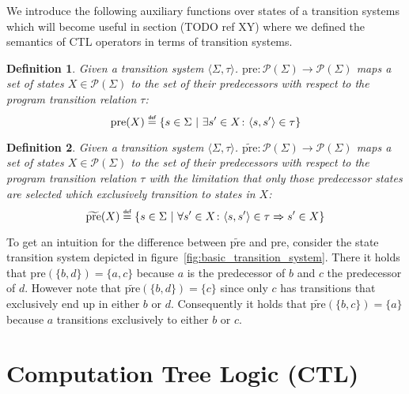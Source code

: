 \documentclass[11pt,a4paper,titlepage]{article}
\newtheorem{definition}{Definition}[section]
\newcommand\eqdef{\mathrel{\overset{\makebox[0pt]{\mbox{\normalfont\tiny\sffamily def}}}{=}}}
\begin{document}
We introduce the following auxiliary functions over states of a transition systems which will become 
useful in section (TODO ref XY) where we defined the semantics of CTL operators in terms of transition systems.

\begin{definition}\label{def:pre}
    Given a transition system $\langle \Sigma, \tau \rangle$. $\text{pre} \colon \mathcal{P}(\Sigma) \to \mathcal{P}(\Sigma)$
    maps a set of states $X \in \mathcal{P}(\Sigma)$ to the set of their predecessors with respect to the program transition
    relation $\tau$:
\begin{equation}
    \text{pre}(X) \eqdef \{s \in \Sigma \ | \ \exists s' \in X \colon \langle s, s' \rangle \in \tau \}  
\end{equation}
\end{definition}


\begin{definition}\label{def:tilde_pre}
    Given a transition system $\langle \Sigma, \tau \rangle$. $\widetilde{\text{pre}} \colon \mathcal{P}(\Sigma) \to \mathcal{P}(\Sigma)$
    maps a set of states $X \in \mathcal{P}(\Sigma)$ to the set of their predecessors with respect to the program transition
    relation $\tau$ with the limitation that only those predecessor states are selected which exclusively transition to states in $X$:
\begin{equation}
    \widetilde{\text{pre}}(X) \eqdef \{s \in \Sigma \ | \ \forall s' \in X \colon \langle s, s' \rangle \in \tau \Rightarrow s' \in X \}  
\end{equation}
\end{definition}

To get an intuition for the difference between $\widetilde{\text{pre}}$ and $\text{pre}$, consider the state transition system 
depicted in figure~\ref{fig:basic_transition_system}. There it holds that $\text{pre}(\{b, d\}) = \{a, c\}$ 
because $a$ is the predecessor of $b$ and $c$ the predecessor of $d$. 
However note that $\widetilde{\text{pre}}(\{b, d\}) = \{c\}$ since only $c$ has 
transitions that exclusively end up in either $b$ or $d$. 
Consequently it holds that $\widetilde{\text{pre}}(\{b, c\}) = \{a\}$ because $a$ transitions exclusively to either $b$ or $c$.


\section{Computation Tree Logic (CTL)}\label{sec:computation_tree_logic}
\end{document}
